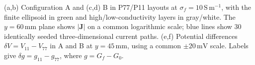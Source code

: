(a,b) Configuration A and (c,d) B in P77/P11 layouts at $\sigma_f=10\,\mathrm{S\,m^{-1}}$, with the finite ellipsoid in green and high/low-conductivity layers in gray/white. The $y=60\,\mathrm{mm}$ plane shows $|\mathbf{J}|$ on a common logarithmic scale; blue lines show 30 identically seeded three-dimensional current paths. (e,f) Potential differences $\delta V=V_{11}-V_{77}$ in A and B at $y=45\,\mathrm{mm}$, using a common $\pm20\,\mathrm{mV}$ scale. Labels give $\delta g=g_{11}-g_{77}$, where $g=G_f-G_0$.
